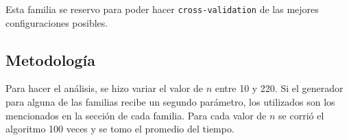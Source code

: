 Esta familia se reservo para poder hacer \texttt{cross-validation} de las mejores configuraciones posibles.

\subsection{Metodología}

Para hacer el análisis, se hizo variar el valor de $n$ entre 10 y 220. Si el generador para alguna de las familias recibe un segundo parámetro, los utilizados son los mencionados en la sección de cada familia. Para cada valor de $n$ se corrió el algoritmo 100 veces y se tomo el promedio del tiempo.